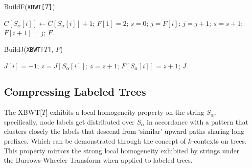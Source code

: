 \begin{algorithm}[H]
    \caption{BuildF(\texttt{XBWT[$T$]})}
    \label{alg:buildF}
    \begin{algorithmic}[1]
        \State $C[S_\alpha[i]] \gets C[S_\alpha[i]] + 1$; 
    \EndFor
    \State $F[1] = 2$; 
     
        \State $s = 0$; $j = F[i]$;
         
            \State $j = j + 1$;
             
                \State $s = s + 1$;
            \EndIf
        \EndWhile
        \State $F[i+1] = j$;
    \EndFor
    \State \Return $F$.
    \end{algorithmic}
\end{algorithm}
    
\begin{algorithm}[H]
    \caption{BuildJ(\texttt{XBWT[$T$]}, $F$)}
    \begin{algorithmic}[1]
            \State $J[i] = -1$; 
        \Else
            \State $z = J[S_\alpha[i]]$;
             
                \State $z = z + 1$;
            \EndWhile
            \State $F[S_\alpha[i]] = z + 1$;
        \EndIf
    \EndFor
    \State \Return $J$.
    \end{algorithmic}
\end{algorithm}

\subsection{Compressing Labeled Trees}

The XBWT[$T$] exhibits a local homogeneity property on the string $S_{\alpha}$, specifically, node labels get distributed over $S_{\alpha}$ in accordance with a pattern that clusters closely the labels that descend from `similar' upward paths sharing long prefixes. Which can be demonstrated through the concept of $k$-contexts on trees. 
This property mirrors the strong local homogeneity exhibited by strings under the Burrows-Wheeler Transform \cite{burrows1994block} when applied to labeled trees.

